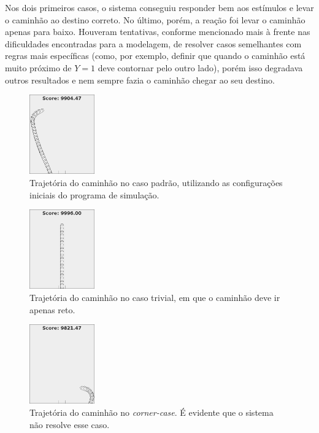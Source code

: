 \documentclass[twocolumn]{article}
\begin{document}
    Nos dois primeiros casos, o sistema conseguiu responder bem aos estímulos e
    levar o caminhão ao destino correto. No último, porém, a reação foi levar o
    caminhão apenas para baixo. Houveram tentativas, conforme mencionado mais à
    frente nas dificuldades encontradas para a modelagem, de resolver casos
    semelhantes com regras mais específicas (como, por exemplo, definir que
    quando o caminhão está muito próximo de $Y = 1$ deve contornar pelo outro
    lado), porém isso degradava outros resultados e nem sempre fazia o caminhão
    chegar ao seu destino.

    \begin{figure}[ht]
        \centering{}
        \includegraphics[keepaspectratio,width=0.25\textwidth]{img/test-default}
        \caption{%
            Trajetória do caminhão no caso padrão, utilizando as configurações
            iniciais do programa de simulação.\label{figure-test-default}
        }
    \end{figure}

    \begin{figure}[ht]
        \centering{}
        \includegraphics[keepaspectratio,width=0.25\textwidth]{img/test-trivial}
        \caption{%
            Trajetória do caminhão no caso trivial, em que o caminhão deve ir
            apenas reto.\label{figure-test-trivial}
        }
    \end{figure}

    \begin{figure}[ht]
        \centering{}
        \includegraphics[keepaspectratio,width=0.25\textwidth]{img/test-corner}
        \caption{%
            Trajetória do caminhão no \textit{corner-case}. É evidente que o
            sistema não resolve esse caso.\label{figure-test-corner}
        }
    \end{figure}
\end{document}

